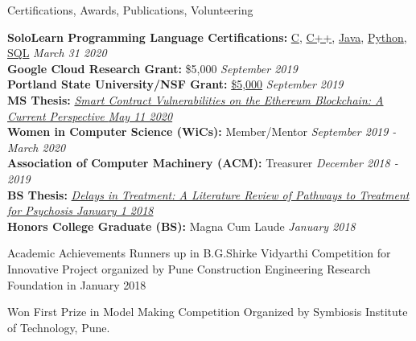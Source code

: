 \documentclass{resume} %
\begin{document}

\begin{rSection}{Certifications, Awards, Publications, Volunteering}

{\bf{SoloLearn Programming Language Certifications:}} 
  \href{https://www.sololearn.com/Certificate/1089-17953779/pdf/?mode=download}{C}, 
  \href{https://www.sololearn.com/Certificate/1051-17953779/pdf/?mode=download}{C++},
  \href{https://www.sololearn.com/Certificate/1068-17953779/pdf/?mode=download}{Java},
  \href{https://www.sololearn.com/Certificate/1073-17953779/pdf/?mode=download}{Python}, 
  \href{https://www.sololearn.com/Certificate/1060-17953779/pdf/?mode=download}{SQL} \hfill {\em{March 31 2020}}\\
{\bf{Google Cloud Research Grant:}} \$5,000 \hfill {\em{September 2019}}\\
  {\bf{Portland State University/NSF Grant:}} \href{https://www.nsf.gov/awardsearch/showAward?AWD\_ID=1821841}{\$5,000} \hfill {\em{September 2019}}\\
  {\bf{MS Thesis:}} \href{https://www.slideshare.net/DanielConnelly15/daniel-connelly-ethereum-smart-contract-masters-thesis}{\itshape{Smart Contract Vulnerabilities on the Ethereum Blockchain: A Current Perspective \hfill {\em{May 11 2020}}}}\\
  {\bf{Women in Computer Science (WiCs):}} Member/Mentor \hfill {\em{September 2019 - March 2020}}\\
  {\bf{Association of Computer Machinery (ACM):}} Treasurer \hfill {\em{December 2018 - 2019}}\\
  {\bf{BS Thesis:}} \href{https://pdxscholar.library.pdx.edu/honorstheses/496/}{\itshape{Delays in Treatment: A Literature Review of Pathways to Treatment for Psychosis \hfill{\em{January 1 2018}}}}\\
  {\bf{Honors College Graduate (BS):}} Magna Cum Laude \hfill {\em{January 2018}}\\

\end{rSection}






\iffalse
\begin{rSection}{Academic Achievements} 
 Runners up in B.G.Shirke Vidyarthi Competition for Innovative Project organized by Pune Construction Engineering Research Foundation in January 2018
\item Won First Prize in Model Making Competition Organized by Symbiosis Institute of Technology, Pune.
\end{rSection}
\end{document}
